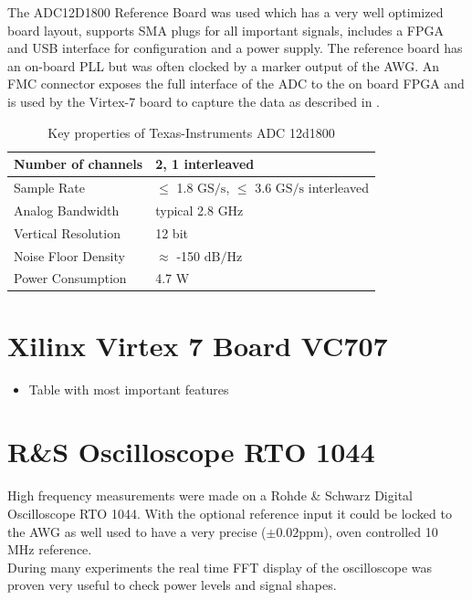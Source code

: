 The ADC12D1800 Reference Board was used which has a very well optimized board
layout, supports \gls{SMA} plugs for all important signals, includes a
\gls{FPGA} and \gls{USB} interface for configuration and a power supply.
The reference board has an on-board \gls{PLL} but was often clocked by a marker
output of the \gls{AWG}.
An \gls{FMC} connector exposes the full interface of the \gls{ADC} to
the on board \gls{FPGA} and is used by the Virtex-7 board to capture the data
as described in . \\

\begin{table}[h]
  \centering
  \begin{tabular}{|l|l|}
    \hline
    Number of channels & 2, 1 interleaved \\ \hline
    Sample Rate & $\leq$ 1.8 $\text{GS}/\text{s}$, $\leq$ 3.6 $\text{GS}/\text{s}$ interleaved \\ \hline
    Analog Bandwidth & typical 2.8 GHz \\ \hline
    Vertical Resolution & 12 bit \\ \hline
    Noise Floor Density & $\approx$ -150 $\text{dB}/\text{Hz}$ \\ \hline
    Power Consumption & 4.7 W \\ \hline
  \end{tabular}
  \caption{Key properties of Texas-Instruments ADC 12d1800}
  \label{tab:awg}
\end{table}

\section{Xilinx Virtex 7 Board VC707}
\label{sec:comp_virtex7}
\begin{itemize}
\item Table with most important features
\end{itemize}

\section{R\&S Oscilloscope RTO 1044}
\label{sec:comp_osci}
High frequency measurements were made on a Rohde \& Schwarz Digital
Oscilloscope RTO 1044. With the optional reference input it could be locked
to the \gls{AWG} as well used to have a very precise ($\pm 0.02 \text{ppm}$),
oven controlled 10 MHz reference. \\

During many experiments the real time \gls{FFT} display of the oscilloscope was
proven very useful to check power levels and signal shapes. \\

